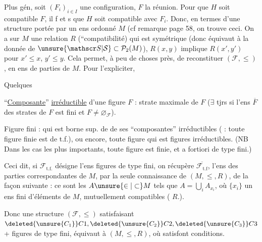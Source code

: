 Plus gén, soit $(F_i)_{i\in I}$ une configuration, $F$ la   réunion. Pour que $H$ soit compatible  $F$, il f et s que $H$ soit compatible avec $F_i$.
Donc, en termes d'une structure portée par un ens ordonné $M$ (cf remarque page 58, on trouve ceci. On a sur  $M$ une relation $R$ (``compatibilité) qui est  symétrique (donc équivaut à la donnée de $\unsure{\mathscr S|\mathcal S}\subset\mathcal P_2(M)$),  $R(x,y)$ implique $R(x',y')$ pour $x'\leq x$, $y'\leq y$.  Cela permet, à peu de choses près, de reconstituer $(\mathcal F,\leq)$, en ens de parties de $M$. Pour l'expliciter,

Quelques 

``\uline{Composante}'' \uline{irréductible}  d'une figure $F$ : strate maximale de $F$ ($\exists$ tjrs si l'ens $\overline F$ des strates de $F$ est fini  et $F\ne\varnothing_{\mathcal F}$).

Figure  fini : qui est borne sup. de  de ses ``composantes'' irréductibles ( : toute figure finie est de t.f.), ou encore, toute figure  qui est  figures irréductibles.  (NB Dans les cas les plus importants, toute figure est finie, et a fortiori de type fini.)

Ceci dit, si $\mathcal F_{\mathrm{t.f.}}$ désigne l'ens figures de type fini, on récupère $\overline{\mathcal F_{\mathrm{t.f}}}$, l'ens des parties correspondantes de $M$, par la seule connaissance de $(M,\leq,R)$,
de la façon suivante : ce sont les $A\unsure{\in|\subset}M$ tels que $A=\bigcup_i A_{x_i}$, où  $\{x_i\}$  un ens fini d'éléments de $M$, mutuellement compatibles ( $R$.).

Donc une structure $(\mathcal F,\leq)$ satisfaisant $\deleted{\unsure{C_1}}C1,\deleted{\unsure{C_2}}C2,\deleted{\unsure{C_3}}C3$ + figures  de type fini, équivaut à $(M,\leq,R)$, où   satisfont  conditions.

